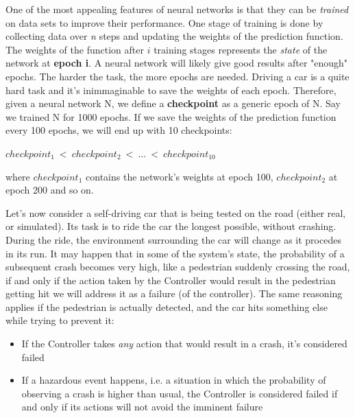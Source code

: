 One of the most appealing features of neural networks is that they can be \textsl{trained} on data sets to improve their performance. One stage of training is done by collecting data over \textsl{n} steps and updating the weights of the prediction function. The weights of the function after $i$ training stages represents the \textsl{state} of the network at \textbf{epoch i}.\newline
A neural network will likely give good results after "enough" epochs. The harder the task, the more epochs are needed. Driving a car is a quite hard task and it's inimmaginable to save the weights of each epoch. Therefore, given a neural network N, we define a \textbf{checkpoint} as a generic epoch of N. Say we trained N for 1000 epochs. If we save the weights of the prediction function every 100 epochs, we will end up with 10 checkpoints:

\begin{center}
	$checkpoint_{1}\: <\: checkpoint_{2}\: <\: \dots \:<\: checkpoint_{10}$
\end{center}

where $checkpoint_{1}$ contains the network's weights at epoch 100, $checkpoint_{2}$ at epoch 200 and so on.\newline

Let's now consider a self-driving car that is being tested on the road (either real, or simulated). Its task is to ride the car the longest possible, without crashing. During the ride, the environment surrounding the car will change as it procedes in its run. It may happen that in some of the system's state, the probability of a subsequent crash becomes very high, like a pedestrian suddenly crossing the road, if and only if the action taken by the Controller would result in the pedestrian getting hit we will address it as a failure (of the controller). The same reasoning applies if the pedestrian is actually detected, and the car hits something else while trying to prevent it:

\begin{itemize}
	\item If the Controller takes \textsl{any} action that would result in a crash, it's considered failed
	\item If a hazardous event happens, i.e. a situation in which the probability of observing a crash is higher than usual, the Controller is considered failed if and only if its actions will not avoid the imminent failure
\end{itemize}

